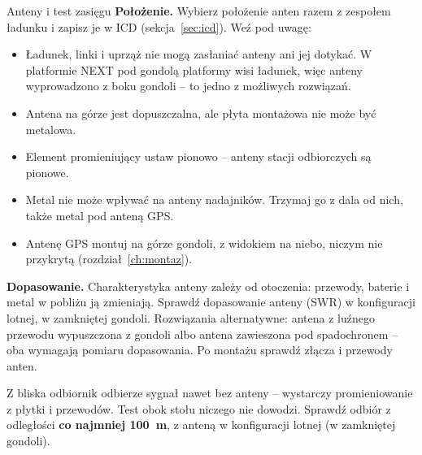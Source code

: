 \begin{sekcja}{Anteny i test zasięgu}\label{sec:anteny}
\textbf{Położenie.} Wybierz położenie anten razem z zespołem ładunku i zapisz je w ICD (sekcja~\ref{sec:icd}). Weź pod uwagę:
\begin{itemize}
  \item Ładunek, linki i uprząż nie mogą zasłaniać anteny ani jej dotykać. W platformie NEXT pod gondolą platformy wisi ładunek, więc anteny wyprowadzono z boku gondoli -- to jedno z możliwych rozwiązań.
  \item Antena na górze jest dopuszczalna, ale płyta montażowa nie może być metalowa.
  \item Element promieniujący ustaw pionowo -- anteny stacji odbiorczych są pionowe.
  \item Metal nie może wpływać na anteny nadajników. Trzymaj go z dala od nich, także metal pod anteną GPS.
  \item Antenę GPS montuj na górze gondoli, z widokiem na niebo, niczym nie przykrytą (rozdział~\ref{ch:montaz}).
\end{itemize}

\textbf{Dopasowanie.} Charakterystyka anteny zależy od otoczenia: przewody, baterie i metal w pobliżu ją zmieniają. Sprawdź dopasowanie anteny (SWR) w konfiguracji lotnej, w zamkniętej gondoli. Rozwiązania alternatywne: antena z luźnego przewodu wypuszczona z gondoli albo antena zawieszona pod spadochronem -- oba wymagają pomiaru dopasowania. Po montażu sprawdź złącza i przewody anten.

\begin{uwaga}Z bliska odbiornik odbierze sygnał nawet bez anteny -- wystarczy promieniowanie z płytki i przewodów. Test obok stołu niczego nie dowodzi. Sprawdź odbiór z odległości \textbf{co najmniej \SI{100}{m}}, z anteną w konfiguracji lotnej (w zamkniętej gondoli).\end{uwaga}
\end{sekcja}

